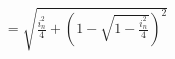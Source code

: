 \documentclass[preview]{standalone}
\begin{document}
\begin{align*}
= \sqrt{\frac{i_n^2}{4} + \left( 1 - \sqrt{1 - \frac{i_n^2}{4}} \right)^2}
\end{align*}
\end{document}
